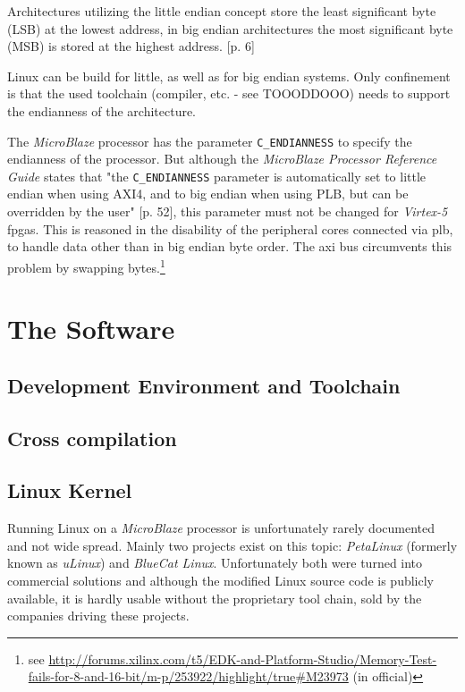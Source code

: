 Architectures utilizing the little endian concept store the least significant byte (LSB) at the lowest address, in big endian architectures the most significant byte (MSB) is stored at the highest address. \cite{intel_endiannness}[p. 6]

Linux can be build for little, as well as for big endian systems. Only confinement is that the used toolchain (compiler, etc. - see TOOODDOOO) needs to support the endianness of the architecture.

The \textit{MicroBlaze} processor has the parameter \texttt{C\_ENDIANNESS} to specify the endianness of the processor. But although the \textit{MicroBlaze Processor Reference Guide} states that "the \texttt{C\_ENDIANNESS} parameter is automatically set to little endian when using AXI4, and to big endian when using PLB, but can be overridden by the user" \cite{mb_ref}[p. 52], this parameter must not be changed for \textit{Virtex-5} \gls{fpga}s. This is reasoned in the disability of the peripheral cores connected via \gls{plb}, to handle data other than in big endian byte order. The \gls{axi} bus circumvents this problem by swapping bytes.\footnote{see \url{http://forums.xilinx.com/t5/EDK-and-Platform-Studio/Memory-Test-fails-for-8-and-16-bit/m-p/253922/highlight/true\#M23973} (in official)}


\section{The Software}

\subsection{Development Environment and Toolchain}

\subsection{Cross compilation}

\subsection{Linux Kernel}

Running Linux on a \textit{MicroBlaze} processor is unfortunately rarely documented and not wide spread. Mainly two projects exist on this topic: \textit{PetaLinux} (formerly known as \textit{uLinux}) and \textit{BlueCat Linux}. Unfortunately both were turned into commercial solutions and although the modified Linux source code is publicly available, it is hardly usable without the proprietary tool chain, sold by the companies driving these projects.

